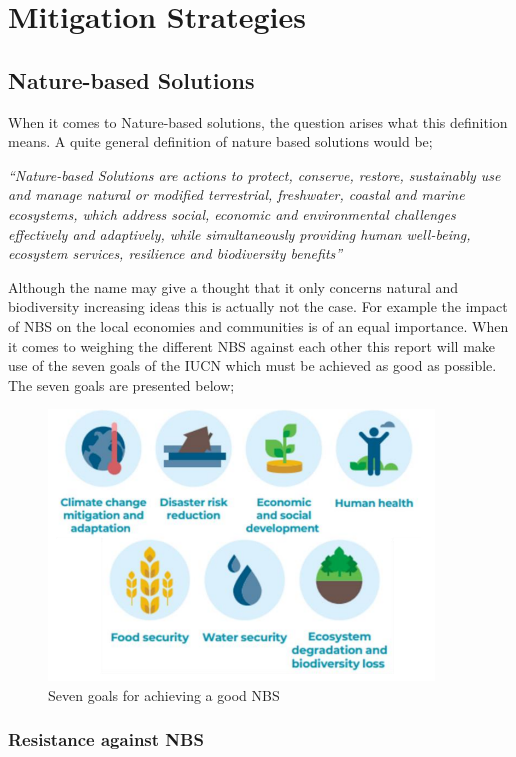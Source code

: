 \chapter{Mitigation Strategies}
\label{chap:mitigationstrats}

\section{Nature-based Solutions}

When it comes to Nature-based solutions, the question arises what this definition means. A quite general definition of nature based solutions would be;

\textit{“Nature-based Solutions are actions to protect, conserve, restore, sustainably
use and manage natural or modified terrestrial, freshwater, coastal and marine
ecosystems, which address social, economic and environmental challenges
effectively and adaptively, while simultaneously providing human well-being,
ecosystem services, resilience and biodiversity benefits” \autocite{eiselinVerenigdeNatiesStemmen2022}}

Although the name may give a thought that it only concerns natural and biodiversity increasing ideas this is actually not the case. For example the impact of NBS on the local economies and communities is of an equal importance. When it comes to weighing the different NBS against each other this report will make use of the seven goals of the IUCN which must be achieved as good as possible. The seven goals are presented below;

\begin{figure}[H]
    \centering
    \includegraphics[width=0.50\linewidth]{figures/ThesevenNBSgoals.png}
    \caption{Seven goals for achieving a good NBS \autocite{.....}}
    \label{fig:7g}
\end{figure}

\subsection{Resistance against NBS}

